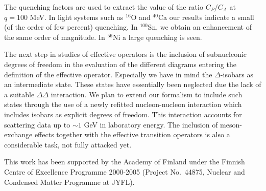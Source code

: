 The quenching factors are used to extract the value of the ratio $C_P/C_A$
at $q=100$ MeV. In light systems such as $^{16}$O 
and $^{40}$Ca our results indicate 
a small (of the order of few percent) quenching. In $^{100}$Sn, we obtain 
an enhancement of the same order of magnitude. In $^{56}$Ni a large
quenching is seen.

The next step in studies of effective operators
is the inclusion of subnucleonic degrees of freedom in the evaluation
of the different diagrams entering the definition of the effective
operator. Especially we have in mind the   
$\Delta$-isobars as an intermediate
state. These states have essentially been neglected due 
the lack of a suitable $\Delta\Delta$ interaction. 
We plan to extend our formalism to include such states through the use
of a newly refitted nucleon-nucleon interaction which includes
isobars as explicit degrees of freedom. This interaction \cite{mach2000} 
accounts for scattering data up to $\sim 1$ GeV in laboratory energy.  
The inclusion of meson-exchange
effects together with the effective transition operators is also a
considerable
task, not fully attacked yet.

This work has been supported by the Academy of Finland under the
Finnish Centre of Excellence Programme 2000-2005 (Project No.\
44875, Nuclear and Condensed Matter Programme at JYFL).

